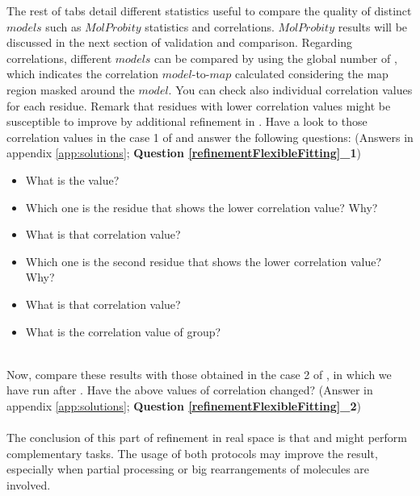   The rest of tabs detail different statistics useful to compare the quality of distinct $models$ such as $MolProbity$ statistics and  correlations. $MolProbity$ results will be discussed in the next section of validation and comparison. Regarding  correlations, different $models$ can be compared by using the global number of \ccmask, which indicates the correlation $model$-to-$map$ calculated considering the map region masked around the $model$. You can check also individual correlation values for each residue.  Remark that residues with lower correlation values might be susceptible to improve by additional refinement in \coot. Have a look to those correlation values in the case 1 of  and answer the following questions: (Answers in appendix \ref{app:solutions}; \textbf{Question \ref{refinementFlexibleFitting}\_1}) \\
  
  \begin{minipage}{\linewidth}
  \begin{framed}
  \begin{itemize}
  \item What is the \ccmask value?
  \item Which one is the residue that shows the lower correlation value? Why?
  \item What is that correlation value?
  \item Which one is the second residue that shows the lower correlation value? Why?
  \item What is that correlation value?
  \item What is the correlation value of  group?
  \end{itemize}
  \end{framed}
  \end{minipage}\\
  
  
  Now, compare these results with those obtained in the case 2 of , in which we have run \phenix {} after \coot. Have the above values of correlation changed? (Answer in appendix \ref{app:solutions}; \textbf{Question \ref{refinementFlexibleFitting}\_2})\\
  \\The conclusion of this part of refinement in real space is that \coot and \phenix {} might perform complementary tasks. The usage of both protocols may improve the result, especially when partial processing or big rearrangements of molecules are involved.\\
  
